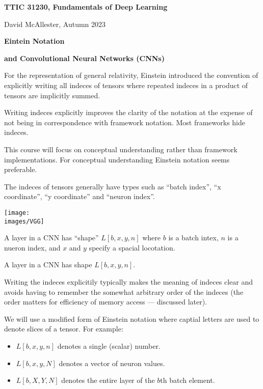 




{\Huge

  \centerline{\bf TTIC 31230, Fundamentals of Deep Learning}
  \bigskip
  \centerline{David McAllester, Autumn 2023}

    \vfill
  \centerline{\bf Eintein Notation}
  \vfill
  \centerline{\bf and Convolutional Neural Networks (CNNs)}
  \vfill


For the representation of general relativity, Einstein introduced the convention of explicitly writing all indeces of tensors where repeated indeces in a product of tensors are implicitly summed.

\vfill
Writing indeces explicitly improves the clarity of the notation at the expense of not being in correspondence with framework notation.  Most frameworks hide indeces.

\vfill
This course will focus on conceptual understanding rather than framework implementations.  For conceptual understanding Einstein notation seems preferable.


The indeces of tensors generally have types such as ``batch index'', ``x coordinate'', ``y coordinate'' and  ``neuron index''.

\vfill
\centerline{\texttt{[image: \\images/VGG]}}

\vfill
A layer in a CNN has ``shape'' {\color{red} $L[b,x,y,n]$} where $b$ is a batch intex, $n$ is a nueron index, and $x$ and $y$ specify a spacial locotation.


A layer in a CNN has shape $L[b,x,y,n]$.

\vfill
Writing the indeces explicitily typically makes the meaning of indeces clear and avoids having to remember the somewhat arbitrary order of the indeces (the order matters for
efficiency of memory access --- discussed later).


\vfill
We will use a modified form of Einstein notation where captial letters are used to denote slices of a tensor.  For example:

\vfill
\begin{itemize}

\item $L[b,x,y,n]$ denotes a single (scalar) number.
\vfill
\item $L[b,x,y,N]$ denotes a vector of neuron values.
\vfill
\item $L[b,X,Y,N]$ denotes the entire layer of the $b$th batch element.
\end{itemize}

}
